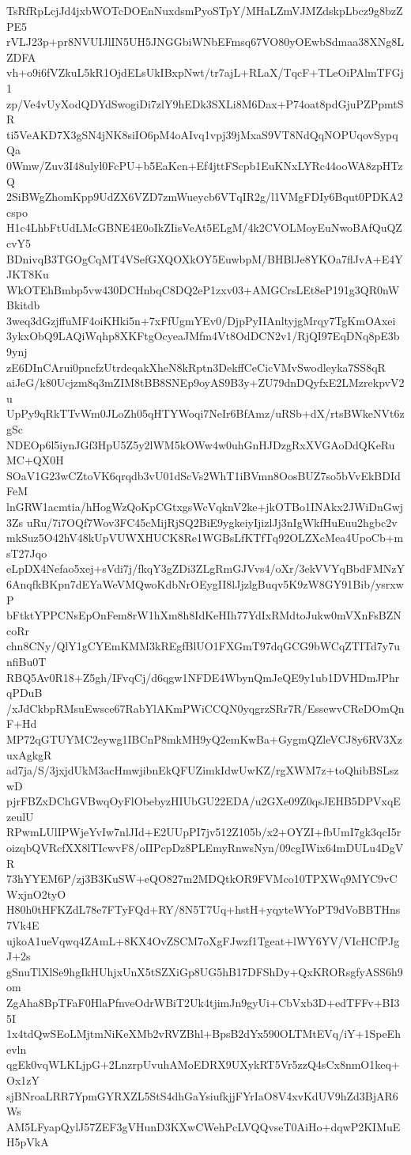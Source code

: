 TsRfRpLcjJd4jxbWOTcDOEnNuxdsmPyoSTpY/MHaLZmVJMZdskpLbcz9g8bzZPE5
rVLJ23p+pr8NVUIJlIN5UH5JNGGbiWNbEFmsq67VO80yOEwbSdmaa38XNg8LZDFA
vh+o9i6fVZkuL5kR1OjdELsUkIBxpNwt/tr7ajL+RLaX/TqcF+TLeOiPAlmTFGj1
zp/Ve4vUyXodQDYdSwogiDi7zlY9hEDk3SXLi8M6Dax+P74oat8pdGjuPZPpmtSR
ti5VeAKD7X3gSN4jNK8siIO6pM4oAIvq1vpj39jMxaS9VT8NdQqNOPUqovSypqQa
0Wmw/Zuv3I48ulyl0FcPU+b5EaKcn+Ef4jttFScpb1EuKNxLYRc44ooWA8zpHTzQ
2SiBWgZhomKpp9UdZX6VZD7zmWueycb6VTqIR2g/l1VMgFDIy6Bqut0PDKA2cspo
H1c4LhbFtUdLMcGBNE4E0oIkZIisVeAt5ELgM/4k2CVOLMoyEuNwoBAfQuQZcvY5
BDnivqB3TGOgCqMT4VSefGXQOXkOY5EuwbpM/BHBlJe8YKOa7flJvA+E4YJKT8Ku
WkOTEhBmbp5vw430DCHnbqC8DQ2eP1zxv03+AMGCrsLEt8eP191g3QR0nWBkitdb
3weq3dGzjffuMF4oiKHki5n+7xFfUgmYEv0/DjpPyIIAnltyjgMrqy7TgKmOAxei
3ykxObQ9LAQiWqhp8XKFtgOcyeaJMfm4Vt8OdDCN2v1/RjQI97EqDNq8pE3b9ynj
zE6DInCArui0pncfzUtrdeqakXheN8kRptn3DekffCeCicVMvSwodleyka7SS8qR
aiJeG/k80Ucjzm8q3mZIM8tBB8SNEp9oyAS9B3y+ZU79dnDQyfxE2LMzrekpvV2u
UpPy9qRkTTvWm0JLoZh05qHTYWoqi7NeIr6BfAmz/uRSb+dX/rtsBWkeNVt6zgSc
NDEOp6l5iynJGf3HpU5Z5y2lWM5kOWw4w0uhGnHJDzgRxXVGAoDdQKeRuMC+QX0H
SOaV1G23wCZtoVK6qrqdb3vU01dScVs2WhT1iBVmn8OosBUZ7so5bVvEkBDIdFeM
lnGRW1acmtia/hHogWzQoKpCGtxgsWcVqknV2ke+jkOTBo1INAkx2JWiDnGwj3Zs
uRu/7i7OQf7Wov3FC45cMijRjSQ2BiE9ygkeiyIjizlJj3nIgWkfHuEuu2hgbc2v
mkSuz5O42hV48kUpVUWXHUCK8Re1WGBsLfKTfTq92OLZXcMea4UpoCb+msT27Jqo
eLpDX4Nefao5xej+sVdi7j/fkqY3gZDi3ZLgRmGJVvs4/oXr/3ekVVYqBbdFMNzY
6AnqfkBKpn7dEYaWeVMQwoKdbNrOEygII8lJjzlgBuqv5K9zW8GY91Bib/ysrxwP
bFtktYPPCNsEpOnFem8rW1hXm8h8IdKeHIh77YdIxRMdtoJukw0mVXnFsBZNcoRr
chn8CNy/QlY1gCYEmKMM3kREgfBlUO1FXGmT97dqGCG9bWCqZTITd7y7unfiBu0T
RBQ5Av0R18+Z5gh/IFvqCj/d6qgw1NFDE4WbynQmJeQE9y1ub1DVHDmJPhrqPDuB
/xJdCkbpRMsuEwsce67RabYlAKmPWiCCQN0yqgrzSRr7R/EssewvCReDOmQnF+Hd
MP72qGTUYMC2eywg1IBCnP8mkMH9yQ2emKwBa+GygmQZleVCJ8y6RV3XzuxAgkgR
ad7ja/S/3jxjdUkM3acHmwjibnEkQFUZimkIdwUwKZ/rgXWM7z+toQhibBSLszwD
pjrFBZxDChGVBwqOyFlObebyzHIUbGU22EDA/u2GXe09Z0qsJEHB5DPVxqEzeulU
RPwmLUlIPWjeYvIw7nlJId+E2UUpPI7jv512Z105b/x2+OYZI+fbUmI7gk3qcI5r
oizqbQVRcfXX8lTIcwvF8/oIIPcpDz8PLEmyRnwsNyn/09cgIWix64mDULu4DgVR
73hYYEM6P/zj3B3KuSW+eQO827m2MDQtkOR9FVMco10TPXWq9MYC9vCWxjnO2tyO
H80h0tHFKZdL78e7FTyFQd+RY/8N5T7Uq+hstH+yqyteWYoPT9dVoBBTHns7Vk4E
ujkoA1ueVqwq4ZAmL+8KX4OvZSCM7oXgFJwzf1Tgeat+lWY6YV/VIcHCfPJgJ+2s
gSnuTlXlSe9hgIkHUhjxUnX5tSZXiGp8UG5hB17DFShDy+QxKRORsgfyASS6h9om
ZgAha8BpTFaF0HlaPfnveOdrWBiT2Uk4tjimJn9gyUi+CbVxb3D+edTFFv+BI35I
1x4tdQwSEoLMjtmNiKeXMb2vRVZBhl+BpsB2dYx590OLTMtEVq/iY+1SpeEhevln
qgEk0vqWLKLjpG+2LnzrpUvuhAMoEDRX9UXykRT5Vr5zzQ4sCx8nmO1keq+Ox1zY
sjBNroaLRR7YpmGYRXZL5StS4dhGaYsiufkjjFYrIaO8V4xvKdUV9hZd3BjAR6Ws
AM5LFyapQylJ57ZEF3gVHunD3KXwCWehPcLVQQvseT0AiHo+dqwP2KIMuEH5pVkA
